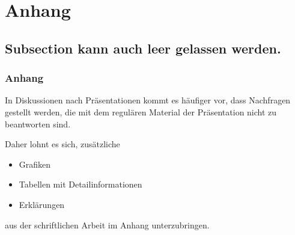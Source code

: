 \section{Anhang}

\subsection{Subsection kann auch leer gelassen werden.}

\begin{frame}
  \frametitle{Anhang}

  In Diskussionen nach Präsentationen kommt es häufiger vor, dass Nachfragen
  gestellt werden, die mit dem regulären Material der Präsentation nicht zu
  beantworten sind.

  Daher lohnt es sich, zusätzliche
  \begin{itemize}
    \item Grafiken
    \item Tabellen mit Detailinformationen
    \item Erklärungen
  \end{itemize}
  aus der schriftlichen Arbeit im Anhang unterzubringen.

\end{frame}
